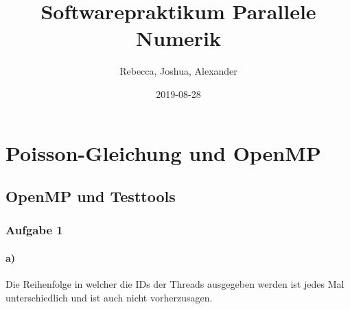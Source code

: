 \documentclass{report}
\title{Softwarepraktikum Parallele Numerik}
\date{2019-08-28}
\author{Rebecca, Joshua, Alexander}
\begin{document}
    \maketitle
        \newpage
    \tableofcontents
    \newpage
    \chapter{Poisson-Gleichung und OpenMP}
    \section{OpenMP und Testtools}
    \subsection{Aufgabe 1}
        \subsubsection{a)}
        Die Reihenfolge in welcher die IDs der Threads ausgegeben werden ist jedes Mal unterschiedlich und ist auch nicht vorherzusagen.
        
\end{document}
